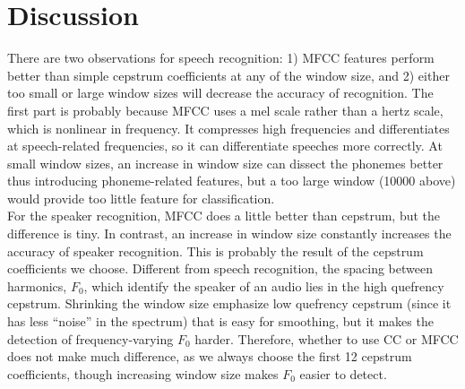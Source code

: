 \documentclass{article}
\begin{document}
	\section{Discussion}
	There are two observations for speech recognition: 1) MFCC features perform better than simple cepstrum coefficients at any of the window size, and 2) either too small or large window sizes will decrease the accuracy of recognition. The first part is probably because MFCC uses a mel scale rather than a hertz scale, which is nonlinear in frequency. It compresses high frequencies and differentiates at speech-related frequencies, so it can differentiate speeches more correctly. At small window sizes, an increase in window size can dissect the phonemes better thus introducing phoneme-related features, but a too large window (10000 above) would provide too little feature for classification.\\
	For the speaker recognition, MFCC does a little better than cepstrum, but the difference is tiny. In contrast, an increase in window size constantly increases the accuracy of speaker recognition. This is probably the result of the cepstrum coefficients we choose. Different from speech recognition, the spacing between harmonics, $F_0$, which identify the speaker of an audio lies in the high quefrency cepstrum. Shrinking the window size emphasize low quefrency cepstrum (since it has less “noise” in the spectrum) that is easy for smoothing, but it makes the detection of frequency-varying $F_0$ harder. Therefore, whether to use CC or MFCC does not make much difference, as we always choose the first 12 cepstrum coefficients, though increasing window size makes $F_0$ easier to detect. 
	
		
		
\end{document}
